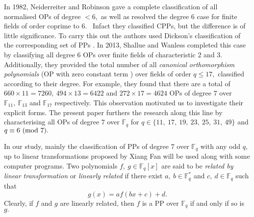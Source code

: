 \documentclass[12pt,a4wide, reqno]{amsart}
\theoremstyle{definition}
\theoremstyle{remark}
\numberwithin{equation}{section}
\begin{document}
In 1982, Neiderreiter and Robinson \cite{CPP1} gave a complete classification of all normalised OPs of degree $<6,$ as well as resolved the degree $6$ case for finite fields of order coprime to $6.$~ Infact they classified  CPPs, but the difference is of little significance. To carry this out the authors used Dickson's classification of the corresponding set of PPs \cite{dickson1, dickson2}. In 2013, Shallue and Wanless \cite{shallue} completed this case by classifying all degree $6$ OPs over finite fields of characteristic $2$ and $3.$ Additionally, they provided the total number of all \textit{canonical orthomorphism polynomials} (OP with zero constant term \cite{wanless2}) over fields of order $q\leq 17,$ classified according to their degree. For example, they found that there are a total of $660\times 11=7260,~494 \times 13=6422$ and $272 \times 17=4624$ OPs of degree $7$ over $\mathbb{F}_{11},~\mathbb{F}_{13}$ and $\mathbb{F}_{17}$ respectively. This observation motivated us to investigate their explicit forms. The present paper furthers the research along this line by characterising all OPs of degree $7$ over $\mathbb{F}_q$ for $q\in\{11,~17,~19,~23,~25,~31,~49\}$ and $q\equiv 6~(\textup{mod}~7).$

In our study, mainly the classification of PPs of degree $7$ over $\mathbb{F}_q$ with any odd $q,$ up to linear transformations proposed by Xiang Fan \cite{xfan} will be used along with some computer programs. Two polynomials $f,~g\in \mathbb{F}_q[x]$ are said to be \textit{related by linear transformation} or \textit{linearly related} if there exist $a,~b\in \mathbb{F}_q^*$ and $c,~d\in \mathbb{F}_q$ such that $$g(x)=af(bx+c)+d.$$
Clearly, if $f$ and $g$ are linearly related, then $f$ is a PP over $\mathbb{F}_q$ if and only if so is $g.$ 
\end{document}
